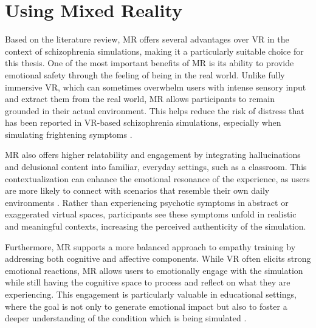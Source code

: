 \section{Using Mixed Reality}

Based on the literature review, MR offers several advantages over VR in the context of schizophrenia simulations, making it a particularly suitable choice for this thesis. One of the most important benefits of MR is its ability to provide emotional safety through the feeling of being in the real world. Unlike fully immersive VR, which can sometimes overwhelm users with intense sensory input and extract them from the real world, MR allows participants to remain grounded in their actual environment. This helps reduce the risk of distress that has been reported in VR-based schizophrenia simulations, especially when simulating frightening symptoms \cite{Zare-Bidaki2022}.

MR also offers higher relatability and engagement by integrating hallucinations and delusional content into familiar, everyday settings, such as a classroom. This contextualization can enhance the emotional resonance of the experience, as users are more likely to connect with scenarios that resemble their own daily environments \cite{Krogmeier2024}. Rather than experiencing psychotic symptoms in abstract or exaggerated virtual spaces, participants see these symptoms unfold in realistic and meaningful contexts, increasing the perceived authenticity of the simulation.

\vspace{1em}

Furthermore, MR supports a more balanced approach to empathy training by addressing both cognitive and affective components. While VR often elicits strong emotional reactions, MR allows users to emotionally engage with the simulation while still having the cognitive space to process and reflect on what they are experiencing. This engagement is particularly valuable in educational settings, where the goal is not only to generate emotional impact but also to foster a deeper understanding of the condition which is being simulated \cite{Martingano2021, Rueda2020}.

\vspace{1em}

